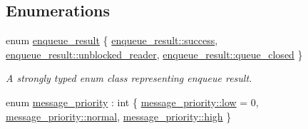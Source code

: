 \subsection*{Enumerations}
\begin{DoxyCompactItemize}
\item 
enum \hyperlink{namespaceactor__zeta_1_1messaging_ac2c5f2f473c5a97d779ec63a78d498a1}{enqueue\+\_\+result} \{ \hyperlink{namespaceactor__zeta_1_1messaging_ac2c5f2f473c5a97d779ec63a78d498a1a260ca9dd8a4577fc00b7bd5810298076}{enqueue\+\_\+result\+::success}, 
\hyperlink{namespaceactor__zeta_1_1messaging_ac2c5f2f473c5a97d779ec63a78d498a1a8505d92f1a08d64e80ebffbde6749069}{enqueue\+\_\+result\+::unblocked\+\_\+reader}, 
\hyperlink{namespaceactor__zeta_1_1messaging_ac2c5f2f473c5a97d779ec63a78d498a1a1f494a6c8d9d6b854fcae46e258d9b85}{enqueue\+\_\+result\+::queue\+\_\+closed}
 \}\begin{DoxyCompactList}\small\item\em A strongly typed enum class representing enqueue result. \end{DoxyCompactList}
\item 
enum \hyperlink{namespaceactor__zeta_1_1messaging_a1b4c4b3ab625eb033c15da4fbe9c4a89}{message\+\_\+priority} \+: int \{ \hyperlink{namespaceactor__zeta_1_1messaging_a1b4c4b3ab625eb033c15da4fbe9c4a89a53cced8d281a1a0ace3cb6594daaa4f7}{message\+\_\+priority\+::low} = 0, 
\hyperlink{namespaceactor__zeta_1_1messaging_a1b4c4b3ab625eb033c15da4fbe9c4a89afea087517c26fadd409bd4b9dc642555}{message\+\_\+priority\+::normal}, 
\hyperlink{namespaceactor__zeta_1_1messaging_a1b4c4b3ab625eb033c15da4fbe9c4a89a8d966b2253a917086c8604959e152243}{message\+\_\+priority\+::high}
 \}
\end{DoxyCompactItemize}

